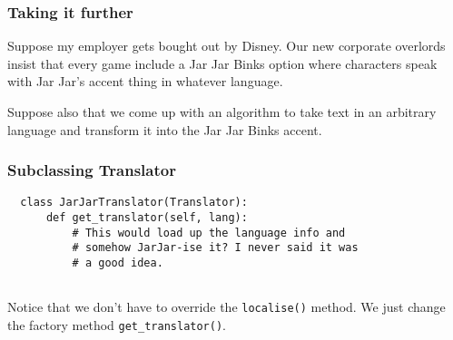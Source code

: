 \documentclass[10pt]{beamer}
\begin{document}
\begin{frame}
  \frametitle{Taking it further}
  
  Suppose my employer gets bought out by Disney. Our new corporate overlords
  insist that every game include a Jar Jar Binks option where characters speak
  with Jar Jar's accent thing in whatever language.
  
  \vspace{5mm}
  Suppose also that we come up with an algorithm to take text in an arbitrary
  language and transform it into the Jar Jar Binks accent.    
\end{frame}

\begin{frame}[fragile]
  \frametitle{Subclassing Translator}

  
  \begin{verbatim}
  class JarJarTranslator(Translator):
      def get_translator(self, lang):
          # This would load up the language info and
          # somehow JarJar-ise it? I never said it was
          # a good idea.
          
  \end{verbatim}
  Notice that we don't have to override the \texttt{localise()} method. We
  just change the factory method \texttt{get\_translator()}.
 \end{frame}  
 
\end{document}
